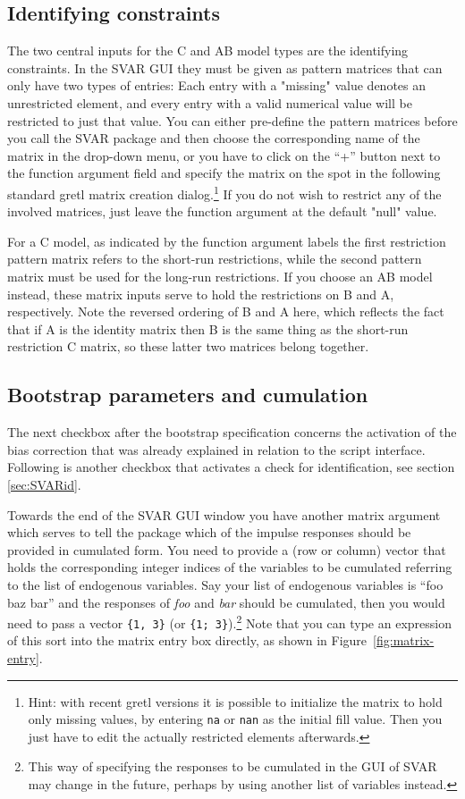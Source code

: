 \documentclass[a4paper,10pt]{article}
\newcommand{\app}[1]{\textsf{#1}}
\newcounter{script}[section]
\begin{document}
\subsection{Identifying constraints}

The two central inputs for the C and AB model types are the
identifying constraints. In the SVAR GUI they must be given as pattern
matrices that can only have two types of entries: Each entry with a
"missing" value denotes an unrestricted element, and every entry with
a valid numerical value will be restricted to just that value. You can
either pre-define the pattern matrices before you call the SVAR
package and then choose the corresponding name of the matrix in the
drop-down menu, or you have to click on the ``+'' button next to the
function argument field and specify the matrix on the spot in the
following standard \app{gretl} matrix creation dialog.\footnote{Hint:
  with recent gretl versions it is possible to initialize the matrix
  to hold only missing values, by entering \texttt{na} or \texttt{nan}
  as the initial fill value. Then you just have to edit the actually
  restricted elements afterwards.} If you do not wish to restrict any
of the involved matrices, just leave the function argument at the
default "null" value.

For a C model, as indicated by the function argument labels the first
restriction pattern matrix refers to the short-run restrictions, while
the second pattern matrix must be used for the long-run
restrictions. If you choose an AB model instead, these matrix inputs
serve to hold the restrictions on B and A, respectively. Note the
reversed ordering of B and A here, which reflects the fact that if A
is the identity matrix then B is the same thing as the short-run
restriction C matrix, so these latter two matrices belong together.

\subsection{Bootstrap parameters and cumulation}

The next checkbox after the bootstrap specification concerns the
activation of the bias correction that was already explained in
relation to the script interface. Following is another checkbox that
activates a check for identification, see section \ref{sec:SVARid}.

Towards the end of the SVAR GUI window you have another matrix
argument which serves to tell the package which of the impulse
responses should be provided in cumulated form. You need to provide a
(row or column) vector that holds the corresponding integer indices of
the variables to be cumulated referring to the list of endogenous
variables. Say your list of endogenous variables is ``foo baz bar''
and the responses of \emph{foo} and \emph{bar} should be cumulated,
then you would need to pass a vector \texttt{\{1, 3\}} (or
\texttt{\{1; 3\}}).\footnote{This way of specifying the responses to
  be cumulated in the GUI of SVAR may change in the future, perhaps by
  using another list of variables instead.} Note that you can type an
expression of this sort into the matrix entry box directly, as shown in
Figure~\ref{fig:matrix-entry}.
\end{document}
